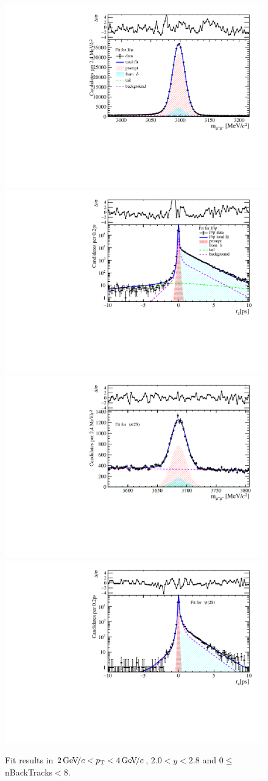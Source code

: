 \begin{figure}[H]
\begin{center}
\includegraphics[width=0.47\linewidth]{pdf/Jpsi/drawmassB/n1y1pt2.pdf}
\includegraphics[width=0.47\linewidth]{pdf/Jpsi/2DFitB/n1y1pt2.pdf}
\vspace*{-0.5cm}
\includegraphics[width=0.47\linewidth]{pdf/Psi2S/drawmassB/n1y1pt2.pdf}
\includegraphics[width=0.47\linewidth]{pdf/Psi2S/2DFitB/n1y1pt2.pdf}
\vspace*{-0.5cm}
\end{center}
\caption{Fit results in $2\text{\,Ge\kern -0.1em V\!/}c<p_{\mathrm{T}}<4\text{\,Ge\kern -0.1em V\!/}c$, $2.0<y<2.8$ and 0$\leq$nBackTracks$<$8.}
\label{Fitn1y1pt2}
\end{figure}
